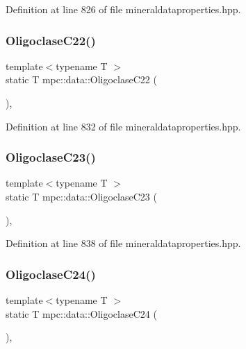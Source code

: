 Definition at line 826 of file mineraldataproperties.\+hpp.

\mbox{\label{namespacempc_1_1data_ae6a6b1385beb304d3f49551aeb8e63b7}} 
\subsubsection{\texorpdfstring{Oligoclase\+C22()}{OligoclaseC22()}}
{\footnotesize\ttfamily template$<$typename T $>$ \\
static T mpc\+::data\+::\+Oligoclase\+C22 (\begin{DoxyParamCaption}{ }\end{DoxyParamCaption})\hspace{0.3cm}{\ttfamily [inline]}, {\ttfamily [static]}}



Definition at line 832 of file mineraldataproperties.\+hpp.

\mbox{\label{namespacempc_1_1data_a222bda32032fa07e51a3f2ca77d7c890}} 
\subsubsection{\texorpdfstring{Oligoclase\+C23()}{OligoclaseC23()}}
{\footnotesize\ttfamily template$<$typename T $>$ \\
static T mpc\+::data\+::\+Oligoclase\+C23 (\begin{DoxyParamCaption}{ }\end{DoxyParamCaption})\hspace{0.3cm}{\ttfamily [inline]}, {\ttfamily [static]}}



Definition at line 838 of file mineraldataproperties.\+hpp.

\mbox{\label{namespacempc_1_1data_a27202f24e8ee8744db3800eb9e456a67}} 
\subsubsection{\texorpdfstring{Oligoclase\+C24()}{OligoclaseC24()}}
{\footnotesize\ttfamily template$<$typename T $>$ \\
static T mpc\+::data\+::\+Oligoclase\+C24 (\begin{DoxyParamCaption}{ }\end{DoxyParamCaption})\hspace{0.3cm}{\ttfamily [inline]}, {\ttfamily [static]}}



